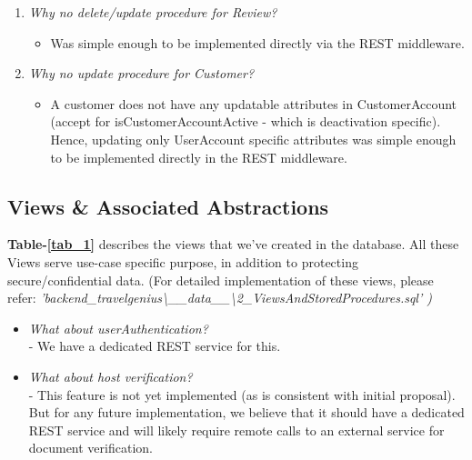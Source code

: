 \documentclass[conference]{IEEEtran}
\begin{document}
\begin{enumerate}
\begin{enumerate}
                \vspace{1mm}
	
	            \item \textit{Why no delete/update procedure for Review?}
                        \begin{itemize}
    	                    \item Was simple enough to be implemented directly via the REST middleware.
	                \end{itemize}
                 
                \vspace{1mm}
	
	            \item \textit{Why no update procedure for Customer?}
	                \begin{itemize}
    	                    \item A customer does not have any updatable attributes in CustomerAccount (accept for isCustomerAccountActive - which is deactivation specific). Hence, updating only UserAccount specific attributes was simple enough to be implemented directly in the REST middleware.
	                \end{itemize}
	        \end{enumerate}
    \end{enumerate}

    \subsection{\textbf{Views \& Associated Abstractions}}
        \textbf{Table-\ref{tab_1}} describes the views that we've created in the database. All these Views serve use-case specific purpose, in addition to protecting secure/confidential data. (For detailed implementation of these views, please refer: \textit{'backend\_travelgenius{\textbackslash}\_\_data\_\_{\textbackslash}2\_ViewsAndStoredProcedures.sql' \cite{4_Backend})}

        \begin{itemize}
            \item \textit{What about userAuthentication?}\\
		- We have a dedicated REST service for this.
            \item \textit{What about host verification?}\\
		- This feature is not yet implemented (as is consistent with initial proposal). But for any future implementation, we believe that it should have a dedicated REST service and will likely require remote calls to an external service for document verification.
        \end{itemize}
\end{document}
